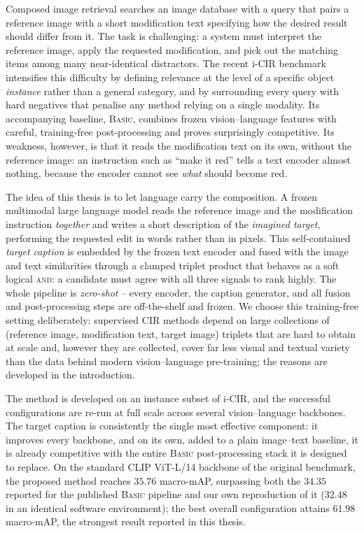 
Composed image retrieval searches an image database with a query that pairs a
reference image with a short modification text specifying how the desired result
should differ from it. The task is challenging: a system must interpret the
reference image, apply the requested modification, and pick out the matching
items among many near-identical distractors. The recent i-CIR benchmark
intensifies this difficulty by defining relevance at the level of a specific
object \emph{instance} rather than a general category, and by surrounding every
query with hard negatives that penalise any method relying on a single modality.
Its accompanying baseline, \textsc{Basic}, combines frozen vision--language
features with careful, training-free post-processing and proves surprisingly
competitive. Its weakness, however, is that it reads the modification text on its
own, without the reference image: an instruction such as ``make it red'' tells a
text encoder almost nothing, because the encoder cannot see \emph{what} should
become red.

The idea of this thesis is to let language carry the composition. A frozen
multimodal large language model reads the reference image and the modification
instruction \emph{together} and writes a short description of the \emph{imagined
target}, performing the requested edit in words rather than in pixels. This
self-contained \emph{target caption} is embedded by the frozen text encoder and
fused with the image and text similarities through a clamped triplet product that
behaves as a soft logical \textsc{and}: a candidate must agree with all three
signals to rank highly. The whole pipeline is \emph{zero-shot} -- every encoder,
the caption generator, and all fusion and post-processing steps are off-the-shelf
and frozen. We choose this training-free setting deliberately: supervised CIR
methods depend on large collections of (reference image, modification text,
target image) triplets that are hard to obtain at scale and, however they are
collected, cover far less visual and textual variety than the data behind modern
vision--language pre-training; the reasons are developed in the introduction.

The method is developed on an instance subset of i-CIR, and the successful
configurations are re-run at full scale across several vision--language
backbones. The target caption is consistently the single most effective
component: it improves every backbone, and on its own, added to a plain
image--text baseline, it is already competitive with the entire \textsc{Basic}
post-processing stack it is designed to replace. On the standard CLIP ViT-L/14
backbone of the original benchmark, the proposed method reaches $35.76$
macro-mAP, surpassing both the $34.35$ reported for the published \textsc{Basic}
pipeline and our own reproduction of it ($32.48$ in an identical software
environment); the best overall configuration attains $61.98$ macro-mAP, the
strongest result reported in this thesis.
